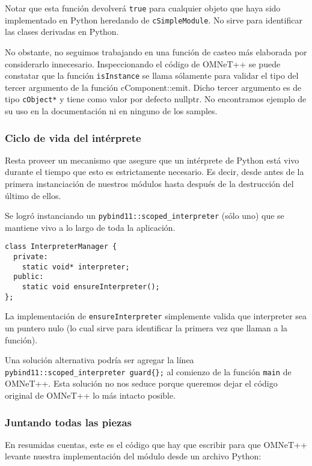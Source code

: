 \documentclass[]{article}
\begin{document}
Notar que esta función devolverá \verb!true! para cualquier objeto que haya
sido implementado en Python heredando de \verb!cSimpleModule!. No sirve para
identificar las clases derivadas en Python.

No obstante, no seguimos trabajando en una función de casteo más elaborada por
considerarlo innecesario. Inspeccionando el código de OMNeT++ se puede
constatar que la función \verb!isInstance! se llama sólamente para validar el
tipo del tercer argumento de la función cComponent::emit. Dicho tercer
argumento es de tipo \verb!cObject*! y tiene como valor por defecto nullptr. No
encontramos ejemplo de su uso en la documentación ni en ninguno de los samples.

\subsubsection{Ciclo de vida del intérprete}

Resta proveer un mecanismo que asegure que un intérprete de Python está vivo
durante el tiempo que esto es estrictamente necesario. Es decir, desde antes de
la primera instanciación de nuestros módulos hasta después de la destrucción
del último de ellos.

Se logró instanciando un \verb!pybind11::scoped_interpreter! (sólo uno) que se
mantiene vivo a lo largo de toda la aplicación.

\begin{verbatim}
class InterpreterManager {
  private:
    static void* interpreter;
  public:
    static void ensureInterpreter();
};
\end{verbatim}

La implementación de \verb!ensureInterpreter! simplemente valida que
interpreter sea un puntero nulo (lo cual sirve para identificar la primera vez
que llaman a la función).

Una solución alternativa podría ser agregar la línea
\verb!pybind11::scoped_interpreter guard{};! al comienzo de la función
\verb!main! de OMNeT++.  Esta solución no nos seduce porque queremos dejar el
código original de OMNeT++ lo más intacto posible.

\subsubsection{Juntando todas las piezas}

En resumidas cuentas, este es el código que hay que escribir para que OMNeT++
levante nuestra implementación del módulo desde un archivo Python:
\end{document}
